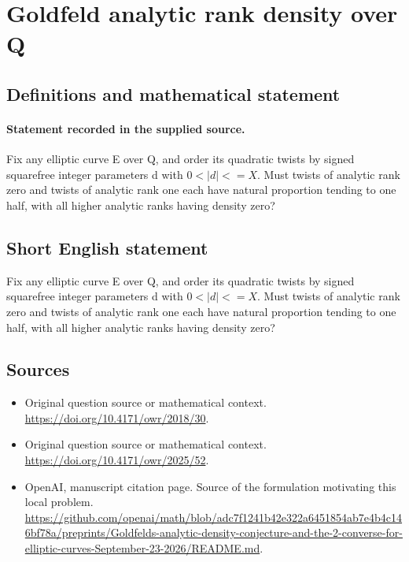 \documentclass[11pt]{article}
\begin{document}
\section*{Goldfeld analytic rank density over Q}\label{statement}
\subsection{Definitions and mathematical statement}
\paragraph{Statement recorded in the supplied source.}
Fix any elliptic curve E over Q, and order its quadratic twists by signed squarefree integer parameters d with $0<|d|<=X$. Must twists of analytic rank zero and twists of analytic rank one each have natural proportion tending to one half, with all higher analytic ranks having density zero?
\subsection{Short English statement}
Fix any elliptic curve E over Q, and order its quadratic twists by signed squarefree integer parameters d with $0<|d|<=X$. Must twists of analytic rank zero and twists of analytic rank one each have natural proportion tending to one half, with all higher analytic ranks having density zero?
\subsection{Sources}
\begin{itemize}
\item[S1] Original question source or mathematical context.
\url{https://doi.org/10.4171/owr/2018/30}.
\item[S2] Original question source or mathematical context.
\url{https://doi.org/10.4171/owr/2025/52}.
\item[S3] OpenAI, manuscript citation page. Source of the formulation motivating this local problem.
\url{https://github.com/openai/math/blob/adc7f1241b42e322a6451854ab7e4b4c146bf78a/preprints/Goldfelds-analytic-density-conjecture-and-the-2-converse-for-elliptic-curves-September-23-2026/README.md}.
\end{itemize}
\end{document}
